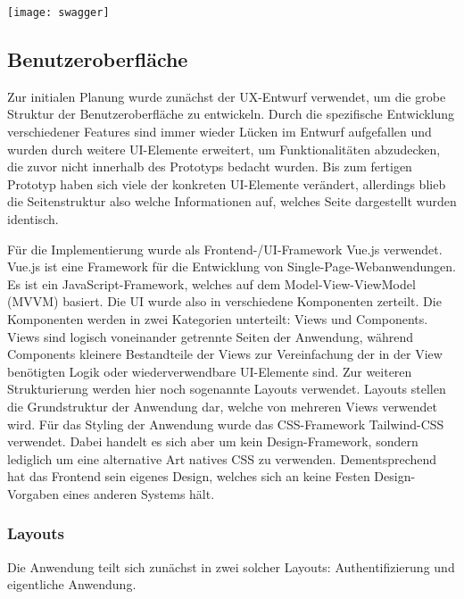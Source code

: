 \vspace{20pt}
\begin{center}
    \begin{minipage}{0.95\linewidth}
        \texttt{[image: swagger]}
    \end{minipage}
\end{center}
\vspace{20pt}

\subsection{Benutzeroberfläche}
Zur initialen Planung wurde zunächst der UX-Entwurf verwendet, um die grobe Struktur der Benutzeroberfläche zu entwickeln. Durch die spezifische Entwicklung verschiedener Features sind immer wieder Lücken im Entwurf aufgefallen und wurden durch weitere UI-Elemente erweitert, um Funktionalitäten abzudecken, die zuvor nicht innerhalb des Prototyps bedacht wurden. Bis zum fertigen Prototyp haben sich viele der konkreten UI-Elemente verändert, allerdings blieb die Seitenstruktur also welche Informationen auf, welches Seite dargestellt wurden identisch.

Für die Implementierung wurde als Frontend-/UI-Framework Vue.js verwendet. Vue.js ist eine Framework für die Entwicklung von Single-Page-Webanwendungen. Es ist ein JavaScript-Framework, welches auf dem Model-View-ViewModel (MVVM) basiert. Die UI wurde also in verschiedene Komponenten zerteilt. Die Komponenten werden in zwei Kategorien unterteilt: Views und Components. Views sind logisch voneinander getrennte Seiten der Anwendung, während Components kleinere Bestandteile der Views zur Vereinfachung der in der View benötigten Logik oder wiederverwendbare UI-Elemente sind. Zur weiteren Strukturierung werden hier noch sogenannte Layouts verwendet. Layouts stellen die Grundstruktur der Anwendung dar, welche von mehreren Views verwendet wird. Für das Styling der Anwendung wurde das CSS-Framework Tailwind-CSS verwendet. Dabei handelt es sich aber um kein Design-Framework, sondern lediglich um eine alternative Art natives CSS zu verwenden. Dementsprechend hat das Frontend sein eigenes Design, welches sich an keine Festen Design-Vorgaben eines anderen Systems hält.

\subsubsection{Layouts}
Die Anwendung teilt sich zunächst in zwei solcher Layouts: Authentifizierung und eigentliche Anwendung.

